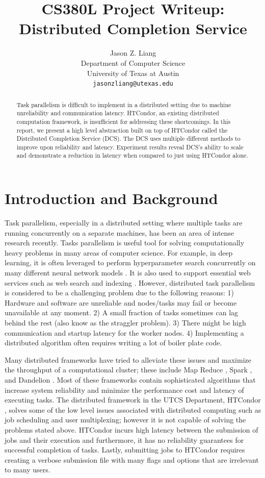 \documentclass{article}
\title{CS380L Project Writeup: Distributed Completion Service}
\author{
  Jason Z. Liang \\
  Department of Computer Science\\
  University of Texas at Austin \\
  \texttt{jasonzliang@utexas.edu} \\
}
\begin{document}
\maketitle

\begin{abstract}
  Task parallelism is difficult to implement in a distributed setting due to machine unreliability and communication latency. HTCondor, an existing distributed computation framework, is insufficient for addressing these shortcomings. In this report, we present a high level abstraction built on top of HTCondor called the Distributed Completion Service (DCS). The DCS uses multiple different methods to improve upon reliability and latency. Experiment results reveal DCS's ability to scale and demonstrate a reduction in latency when compared to just using HTCondor alone.
\end{abstract}

\section{Introduction and Background}

Task parallelism, especially in a distributed setting where multiple tasks are running concurrently on a separate machines, has been an area of intense research recently. Tasks parallelism is useful tool for solving computationally heavy problems in many areas of computer science. For example, in deep learning, it is often leveraged to perform hyperparameter search concurrently on many different neural network models \cite{bergstra2013hyperopt}. It is also used to support essential web services such as web search and indexing \cite{boldi2004ubicrawler}. However, distributed task parallelism is considered to be a challenging problem due to the following reasons: 1) Hardware and software are unreliable and nodes/tasks may fail or become unavailable at any moment. 2) A small fraction of tasks sometimes can lag behind the rest (also know as the straggler problem). 3) There might be high communication and startup latency for the worker nodes. 4) Implementing a distributed algorithm often requires writing a lot of boiler plate code.

Many distributed frameworks have tried to alleviate these issues and maximize the throughput of a computational cluster; these include Map Reduce \cite{dean2008mapreduce}, Spark \cite{zaharia2010spark}, and Dandelion \cite{rossbach2013dandelion}. Most of these frameworks contain sophisticated algorithms that increase system reliability and minimize the performance cost and latency of executing tasks. The distributed framework in the UTCS Department, HTCondor \cite{thain2005distributed}, solves some of the low level issues associated with distributed computing such as job scheduling and user multiplexing; however it is not capable of solving the problems stated above. HTCondor incurs high latency between the submission of jobs and their execution and furthermore, it has no reliability guarantees for successful completion of tasks. Lastly, submitting jobs to HTCondor requires creating a verbose submission file with many flags and options that are irrelevant to many users.
\end{document}
